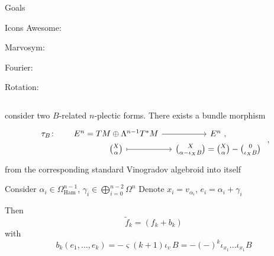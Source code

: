 \documentclass[final,a0paper,20pt,
						pdftex,
            pdfauthor={Antonio Michele Miti},
            pdftitle={Homotopy title},
            pdfsubject={Poster for the conference Super19 in Luxemburg},
            pdfkeywords={Some Keywords},
            pdfproducer={Latex with hyperref, or other system},
            pdfcreator={pdflatex, or other tool}
            ]{beamer}
\begin{document}
\begin{frame}[t,shrink]
\begin{columns}
\begin{column}{\onecolwid}
\begin{block}{Goals}
		\end{block}

		\begin{block}{Icons}
			Awesome:\\
			\faGlobe
			\faAnchor
			\faEnvelope
			\faEnvelopeO
			\faEnvelopeSquare
			\faMailForward
			\faMailReply
			\faMailReplyAll
			\faPaperclip
			\faRotateLeft
			\faRotateRight
			\faThumbTack
			\faLevelDown
			\faArrowDown
			\faPhone
			
			Marvosym:\\
			\ComputerMouse \SerialInterface \Keyboard
			\MVAt \Mundus
			
			Fourier:\\
			\noway 
			\danger
			\textxswup \textxswdown
			\lefthand \righthand \decosix \bomb
		
			Rotation:\\
		\end{block}


\end{column} %
\begin{column}{\sepwidexternal}\end{column} %
\end{columns} %
\end{frame}		


consider two $B$-related $n$-plectic forms. There exists a bundle morphism
\begin{displaymath}
{
	\begin{tikzcd}[column sep= small,row sep=0ex,
				/tikz/column 1/.append style={anchor=base east}]
		\tau_B \colon &
		E^n = TM \oplus \Lambda^{n-1} T^\ast M \ar[r]& E^n ~, \\
	 &\binom{X}{\alpha} \ar[r, mapsto] & 
	 \binom{X}{\alpha - \iota_X B} =
 \binom{X}{\alpha} - \binom{0}{\iota_X B}
	\end{tikzcd}		
}
	 ~,		
\end{displaymath}
from the corresponding standard Vinogradov algebroid into itself

					Consider $\alpha_i \in \Omega_{\text{Ham}}^{n-1}$,
					$\gamma_i \in \bigoplus_{i=0}^{n-2}\Omega^n$
					Denote $ x_i = v_{\alpha_i}$, $e_i = \alpha_i + \gamma_i$

					Then	
					$$\tilde{f}_k = (f_k +b_k)$$
					with
					$$
					b_k(e_1,\dots,e_k) 
					= - \varsigma(k+1)\iota_{v_\cdot} B
					= - (-)^k \iota_{x_1}\dots\iota_{x_1} B
					$$	
\end{document}

